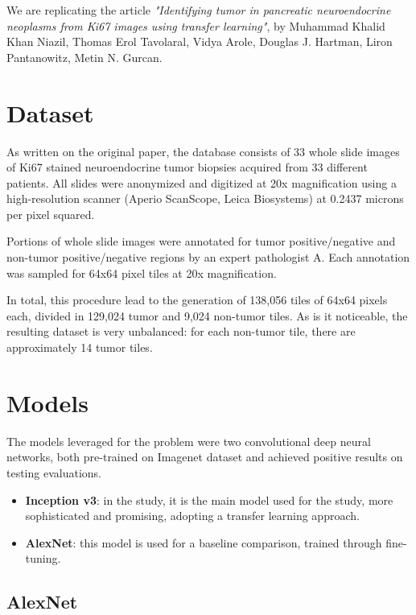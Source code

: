 We are replicating the article \textit{"Identifying tumor in pancreatic neuroendocrine neoplasms from Ki67 images using transfer learning"}, by 
Muhammad Khalid Khan Niazil, Thomas Erol Tavolaral, Vidya Arole, Douglas J. Hartman, Liron Pantanowitz, Metin N. Gurcan.

\section{Dataset}
\label{sec:dataset}

\par
As written on the original paper, the database consists of 33 whole slide images of Ki67 stained neuroendocrine tumor biopsies acquired from 33 different patients. All slides were anonymized and digitized at 20x magnification using a high-resolution scanner (Aperio ScanScope, Leica Biosystems) at 0.2437 microns per pixel squared. 

\par
Portions of whole slide images were annotated for tumor positive/negative and non-tumor positive/negative  regions by an expert pathologist A. Each annotation was sampled for 64x64 pixel tiles at 20x magnification.

\par
In total, this procedure lead to the generation of 138,056 tiles of 64x64 pixels each, divided in 129,024 tumor and 9,024 non-tumor tiles.
As is it noticeable, the resulting dataset is very unbalanced: for each non-tumor tile, there are approximately 14 tumor tiles.

\section{Models}
\label{sec:models}

The models leveraged for the problem were two convolutional deep neural networks, both pre-trained on Imagenet dataset and achieved positive results on testing evaluations.

\begin{itemize}
    \item \textbf{Inception v3}: in the study, it is the main model used for the study, more sophisticated and promising, adopting a transfer learning approach.
    \item \textbf{AlexNet}: this model is used for a baseline comparison, trained through fine-tuning.
\end{itemize}

\subsection{AlexNet}

